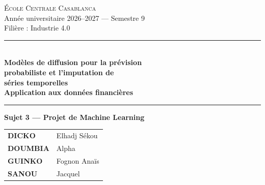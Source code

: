 \documentclass[12pt,a4paper]{article}
\begin{document}
\thispagestyle{empty}
\begin{center}

\noindent\colorbox{eccblue}{%
  \parbox{\dimexpr\linewidth-2\fboxsep}{%
    \centering\vspace{12pt}
    {\color{white}\Large\textsc{\'Ecole Centrale Casablanca}}\\[6pt]
    {\color{eccgold}\large Ann\'ee universitaire 2026--2027 --- Semestre 9}\\[4pt]
    {\color{white}\normalsize Fili\`ere : Industrie 4.0}
    \vspace{10pt}
  }%
}

\vspace{2cm}

{\color{eccgold}\rule{\linewidth}{2pt}}\\[0.5cm]
{\color{eccblue}\LARGE \textbf{Mod\`eles de diffusion pour la pr\'evision\\[4pt] probabiliste et l'imputation de\\[4pt] s\'eries temporelles}}\\[0.4cm]
{\color{eccdark}\Large \textbf{Application aux donn\'ees financi\`eres}}\\[0.3cm]
{\color{eccgold}\rule{\linewidth}{2pt}}

\vspace{0.8cm}

\begin{tcolorbox}[
  colback=eccgold!10,
  colframe=eccgold,
  width=8cm,
  arc=3mm,
  boxrule=1pt,
  halign=center,
]
{\large\bfseries\color{eccblue} Sujet 3 --- Projet de Machine Learning}
\end{tcolorbox}

\vspace{1.2cm}

\begin{tcolorbox}[
  colback=ecclight,
  colframe=eccblue,
  width=12cm,
  arc=2mm,
  boxrule=0.8pt,
  title={\centering Groupe 24 --- \'Equipe projet},
  fonttitle=\bfseries\color{white},
  coltitle=white,
  colbacktitle=eccblue,
]
\centering
\renewcommand{\arraystretch}{1.4}
\begin{tabular}{>{\bfseries}l l}
DICKO & Elhadj S\'ekou \\
DOUMBIA & Alpha \\
GUINKO & Fognon Ana\"is \\
SANOU & Jacquel \\
\end{tabular}
\end{tcolorbox}


\end{center}
\end{document}
